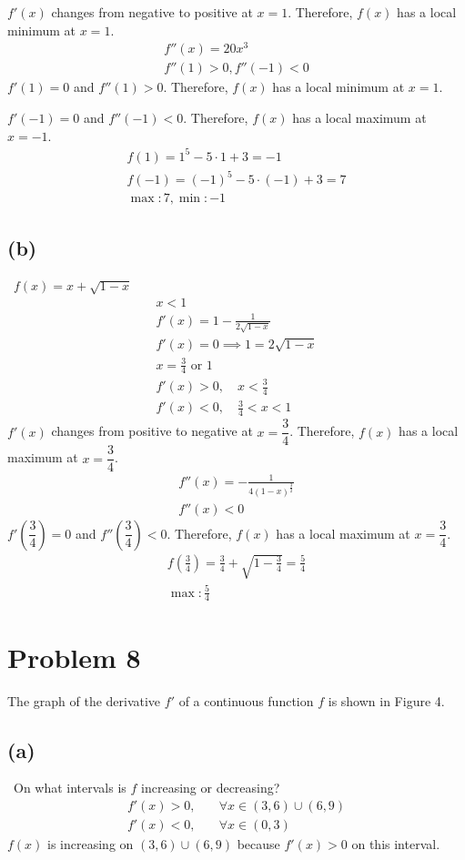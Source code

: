 \documentclass[12pt]{article}
\newcommand{\tor}{\text{ or }}
\newcommand{\vem}{\vspace{0.5em}}
\newcommand{\problem}[1]{\section{Problem #1}}
\newcommand{\subproblem}[1]{\subsection{(#1)} \,}
\begin{document}
$f'(x)$ changes from negative to positive at $x=1$. Therefore, $f(x)$ has a local minimum at $x=1$. 
\begin{gather*}
    f''(x)=20x^3\\
    f''(1)>0, f''(-1)<0
\end{gather*}
$f'(1)=0$ and $f''(1)>0$. Therefore, $f(x)$ has a local minimum at $x=1$.\vem

$f'(-1)=0$ and $f''(-1)<0$. Therefore, $f(x)$ has a local maximum at $x=-1$. 
\begin{gather*}
    f(1)=1^5-5\cdot1+3=-1\\
    f(-1)=(-1)^5-5\cdot (-1)+3=7\\
    \boxed{\max:7, \min :-1}
\end{gather*}

\subproblem{b}
$f(x)=x+\sqrt{1-x}$
\begin{gather*}
    x<1\\
    f'(x)=1-\frac{1}{2\sqrt{1-x}}\\
    f'(x)=0 \implies 1=2\sqrt{1-x}\\
    x=\frac{3}{4} \tor 1\\
    f'(x)>0, \quad x<\frac{3}{4}\\
    f'(x)<0, \quad \frac{3}{4}<x<1
\end{gather*}
$f'(x)$ changes from positive to negative at $x=\dfrac{3}{4}$. Therefore, $f(x)$ has a local maximum at $x=\dfrac{3}{4}$.
\begin{gather*}
    f''(x)=-\frac{1}{4(1-x)^{\frac{3}{2}}}\\
    f''(x)<0
\end{gather*}
$f'(\dfrac{3}{4})=0$ and $f''(\dfrac{3}{4})<0$. Therefore, $f(x)$ has a local maximum at $x=\dfrac{3}{4}$.
\begin{gather*}
    f(\frac{3}{4})=\frac{3}{4}+\sqrt{1-\frac{3}{4}}=\frac{5}{4}\\
    \boxed{\max:\frac{5}{4}}
\end{gather*}

\problem{8}
The graph of the derivative $f'$ of a continuous function $f$ is shown in Figure 4. \vem

\subproblem{a}
On what intervals is $f$ increasing or decreasing?
\begin{align*}
    f'(x)>0,&\quad \forall x \in (3,6) \cup (6,9)\\
    f'(x)<0,&\quad \forall x \in (0,3)
\end{align*}
$f(x)$ is increasing on $(3,6) \cup (6,9)$ because $f'(x)>0$ on this interval. \vem
\end{document}
